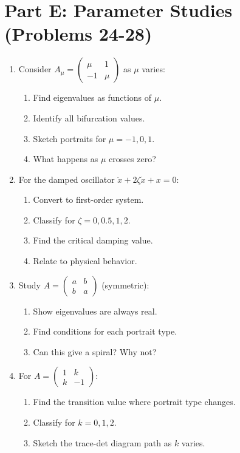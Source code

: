 \documentclass[12pt]{article}
\begin{document}
\section*{Part E: Parameter Studies (Problems 24-28)}

\begin{enumerate}[resume]
\item Consider $A_\mu = \begin{pmatrix} \mu & 1 \\ -1 & \mu \end{pmatrix}$ as $\mu$ varies:
\begin{enumerate}[label=(\alph*)]
    \item Find eigenvalues as functions of $\mu$.
    \item Identify all bifurcation values.
    \item Sketch portraits for $\mu = -1, 0, 1$.
    \item What happens as $\mu$ crosses zero?
\end{enumerate}

\item For the damped oscillator $\ddot{x} + 2\zeta\dot{x} + x = 0$:
\begin{enumerate}[label=(\alph*)]
    \item Convert to first-order system.
    \item Classify for $\zeta = 0, 0.5, 1, 2$.
    \item Find the critical damping value.
    \item Relate to physical behavior.
\end{enumerate}

\item Study $A = \begin{pmatrix} a & b \\ b & a \end{pmatrix}$ (symmetric):
\begin{enumerate}[label=(\alph*)]
    \item Show eigenvalues are always real.
    \item Find conditions for each portrait type.
    \item Can this give a spiral? Why not?
\end{enumerate}

\item For $A = \begin{pmatrix} 1 & k \\ k & -1 \end{pmatrix}$:
\begin{enumerate}[label=(\alph*)]
    \item Find the transition value where portrait type changes.
    \item Classify for $k = 0, 1, 2$.
    \item Sketch the trace-det diagram path as $k$ varies.
\end{enumerate}


\end{enumerate}
\end{document}
